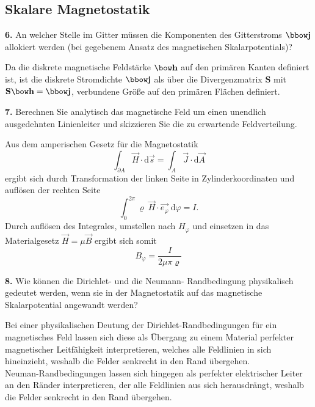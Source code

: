 \documentclass[Protokollheft.tex]{subfiles}
\begin{document}
\newpage
%
{\subsection{Skalare Magnetostatik}}

\begin{framed}
	\noindent \textbf{6.} An welcher Stelle im Gitter müssen die Komponenten des Gitterstroms
$\jfit$ allokiert werden (bei gegebenem Ansatz des magnetischen Skalarpotentials)?\label{exer:allocateCurrent}
\end{framed}
\noindent
Da die diskrete magnetische Feldstärke $\hfit$ auf den primären Kanten definiert ist, ist die diskrete Stromdichte $\jfit$ als über die Divergenzmatrix $\mathbf{S}$ mit $\mathbf{S}\hfit = \jfit$, verbundene Größe auf den primären Flächen definiert. 


\begin{framed}
	\noindent \textbf{7.} Berechnen Sie analytisch das magnetische Feld um einen unendlich
ausgedehnten Linienleiter und skizzieren Sie die zu erwartende
Feldverteilung.\label{exer:HfieldAroundLineConductor}
\end{framed}
\noindent
Aus dem amperischen Gesetz für die Magnetostatik
\begin{equation}
	\label{eq:ampere}
	\int_{\partial A} \vec{H} \cdot \text{d}\vec{s} = \int_A \vec{J} \cdot \text{d} \vec{A} 
\end{equation}
ergibt sich durch Transformation der linken Seite in Zylinderkoordinaten und auflösen der rechten Seite
\begin{equation*}
	\int_{0}^{2\pi} \varrho\ \vec{H} \cdot \vec{e_\varphi}   \ \text{d} \varphi = I.
\end{equation*}
Durch auflösen des Integrales, umstellen nach $H_\varphi$ und einsetzen in das Materialgesetz $\vec{H} = \mu \vec{B}$  ergibt sich somit
\begin{equation}
	\label{eq:bLeiter}
	B_\varphi = \frac{I}{2\mu \pi \varrho} %
\end{equation}


\begin{framed}
	\noindent \textbf{8.} Wie können die Dirichlet- und die Neumann- Randbedingung physikalisch gedeutet werden, wenn sie in der Magnetostatik auf das magnetische Skalarpotential angewandt werden?\label{exer:bndCondMagScalarPot}
\end{framed}
\noindent
Bei einer physikalischen Deutung der Dirichlet-Randbedingungen für ein magnetisches Feld lassen sich diese als Übergang zu einem Material perfekter magnetischer Leitfähigkeit interpretieren, welches alle Feldlinien in sich hineinzieht, weshalb die Felder senkrecht in den Rand übergehen. \\
Neuman-Randbedingungen lassen sich hingegen als perfekter elektrischer Leiter an den Ränder interpretieren, der alle Feldlinien aus sich herausdrängt, weshalb die Felder senkrecht in den Rand übergehen.  
\end{document}
